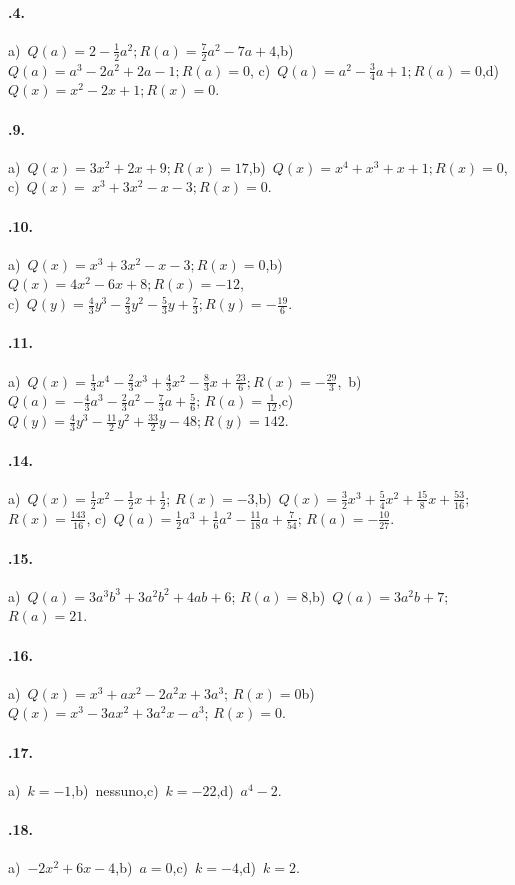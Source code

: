 \paragraph{\thechapter.4.}
a)~$Q(a)=2-\frac{1}{2}a^{2}; R(a)=\frac{7}{2}a^{2}-7a+4$,\quad b)~$Q(a)=a^{3}-2a^{2}+2a-1; R(a)=0$,\quad
c)~$Q(a)=a^{2}-\frac{3}{4}a+1; R(a)=0$,\quad d)~$Q(x)=x^{2}-2x+1; R(x)=0$.
\paragraph{\thechapter.9.}
a)~$Q(x)=3x^{2}+2x+9; R(x)=17$,\quad b)~$Q(x)=x^{4}+x^{3}+x+1; R(x)=0$, \protect\\ c)~$Q(x)=~x^{3}+3x^{2}-x-3; R(x)=0$.
\paragraph{\thechapter.10.}
a)~$Q(x)=x^{3}+3x^{2}-x-3; R(x)=0$,\quad b)~$Q(x)=4x^{2}-6x+8; R(x)=-12$,\protect\\ c)~$Q(y)=\frac{4}{3}y^{3}-\frac{2}{3}y^{2}-\frac{5}{3}y+\frac{7}{3}; R(y)=-\frac{19}{6}$.
\paragraph{\thechapter.11.}
a)~$Q(x)=\frac{1}{3}x^{4}-\frac{2}{3}x^{3}+\frac{4}{3}x^{2}-\frac{8}{3}x+\frac{23}{6}; R(x)=-\frac{29}{3}$,
\,b)~$Q(a)=~{-\frac{4}{3}a^{3}-\frac{2}{3}a^{2}-\frac{7}{3}a+\frac{5}{6}}$; $R(a)=\frac{1}{12}$,\quad c)~$Q(y)=\frac{4}{3}y^{3}-\frac{11}{2}y^{2}+\frac{33}{2}y-48; R(y)=142$.
\paragraph{\thechapter.14.}
a)~$Q(x)=\frac{1}{2}x^{2}-\frac{1}{2}x+\frac{1}{2}$; $R(x)=-3$,\quad b)~$Q(x)=\frac{3}{2}x^{3}+\frac{5}{4}x^{2}+\frac{15}{8}x+\frac{53}{16}$; $R(x)=\frac{143}{16}$,
\quad c)~$Q(a)=\frac{1}{2}a^{3}+\frac{1}{6}a^{2}-\frac{11}{18}a+\frac{7}{54}$; $R(a)=-{\frac{10}{27}}$.
\paragraph{\thechapter.15.}
a)~$Q(a)=3a^{3}b^{3}+3a^{2}b^{2}+4ab+6$; $R(a)=8$,\quad b)~$Q(a)=3a^{2}b+7$; $R(a)=21$.
\paragraph{\thechapter.16.}
a)~$Q(x)=x^{3}+ax^{2}-2a^{2}x+3a^{3}$; $R(x)=0$\quad b)~$Q(x)=x^3-3ax^2+3a^2 x-a^3$; $R(x)=0$.
\paragraph{\thechapter.17.}
a)~$k=-1$,\quad b)~nessuno,\quad c)~$k=-22$,\quad d)~$a^{4}-2$.
\paragraph{\thechapter.18.}
a)~$-2x^2+6x-4$,\quad b)~$a=0$,\quad c)~$k=-4$,\quad d)~$k=2$.
